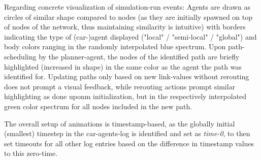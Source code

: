 Regarding concrete visualization of simulation-run events:
Agents are drawn as circles of similar shape compared to nodes (as they are initially spawned on top of nodes of the network, thus maintaining similarity is intuitive) with borders indicating the type of (car-)agent displayed ("local" / "semi-local" / "global") and body colors ranging in the randomly interpolated blue spectrum.
Upon path-scheduling by the planner-agent, the nodes of the identified path are briefly highlighted (increased in shape) in the same color as the agent the path was identified for. Updating paths only based on new link-values without rerouting does not prompt a visual feedback, while rerouting actions prompt similar highlighting as done uponm initialization, but in the respectively interpolated green color spectrum for all nodes included in the new path.

The overall setup of animations is timestamp-based, as the globally initial (smallest) timestep in the car-agents-log is identified and set as \textit{time-0}, to then set timeouts for all other log entries based on the difference in timestamp values to this zero-time.
